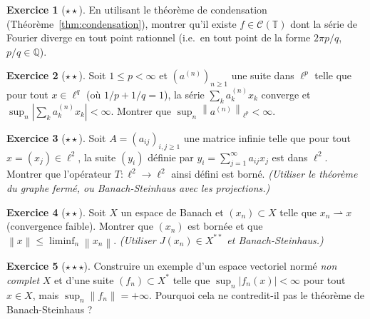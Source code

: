\documentclass[a4paper,12pt]{book}
\newcommand{\Q}{\mathbb{Q}}
\newcommand{\norm}[1]{\left\| #1 \right\|}
\newcommand{\abs}[1]{\left| #1 \right|}
\newcommand{\weakto}{\rightharpoonup}
\theoremstyle{definition}
\newtheorem{exercice}{Exercice}[chapter]
\theoremstyle{plain}
\theoremstyle{remark}
\begin{document}
\begin{exercice}[$\star\star$]
\label{exo:divergence-fourier-tout-point}
En utilisant le théorème de condensation (Théorème~\ref{thm:condensation}),
montrer qu'il existe $f \in \mathcal{C}(\mathbb{T})$ dont la série de Fourier
diverge en tout point rationnel (i.e.\ en tout point de la forme $2\pi p/q$,
$p/q \in \Q$).
\end{exercice}

\begin{exercice}[$\star\star$]
\label{exo:BS-lp}
Soit $1 \leq p < \infty$ et $(a^{(n)})_{n \geq 1}$ une suite dans $\ell^p$
telle que pour tout $x \in \ell^q$ (où $1/p + 1/q = 1$), la série
$\sum_k a^{(n)}_k x_k$ converge et $\sup_n \abs{\sum_k a^{(n)}_k x_k} < \infty$.
Montrer que $\sup_n \norm{a^{(n)}}_{\ell^p} < \infty$.
\end{exercice}

\begin{exercice}[$\star\star$]
\label{exo:matrice-infinie}
Soit $A = (a_{ij})_{i,j \geq 1}$ une matrice infinie telle que pour tout
$x = (x_j) \in \ell^2$, la suite $(y_i)$ définie par $y_i = \sum_{j=1}^{\infty} a_{ij} x_j$
est dans $\ell^2$. Montrer que l'opérateur $T : \ell^2 \to \ell^2$ ainsi
défini est borné. \textit{(Utiliser le théorème du graphe fermé, ou
Banach-Steinhaus avec les projections.)}
\end{exercice}

\begin{exercice}[$\star\star$]
\label{exo:convergence-faible-forte}
Soit $X$ un espace de Banach et $(x_n) \subset X$ telle que $x_n \weakto x$
(convergence faible). Montrer que $(x_n)$ est bornée
et que $\norm{x} \leq \liminf_n \norm{x_n}$. \textit{(Utiliser $J(x_n) \in X^{**}$
et Banach-Steinhaus.)}
\end{exercice}

\begin{exercice}[$\star\star\star$]
\label{exo:BS-non-separable}
Construire un exemple d'un espace vectoriel normé \emph{non complet} $X$ et
d'une suite $(f_n) \subset X^*$ telle que $\sup_n \abs{f_n(x)} < \infty$ pour
tout $x \in X$, mais $\sup_n \norm{f_n} = +\infty$. Pourquoi cela ne contredit-il
pas le théorème de Banach-Steinhaus ?
\end{exercice}
\end{document}
